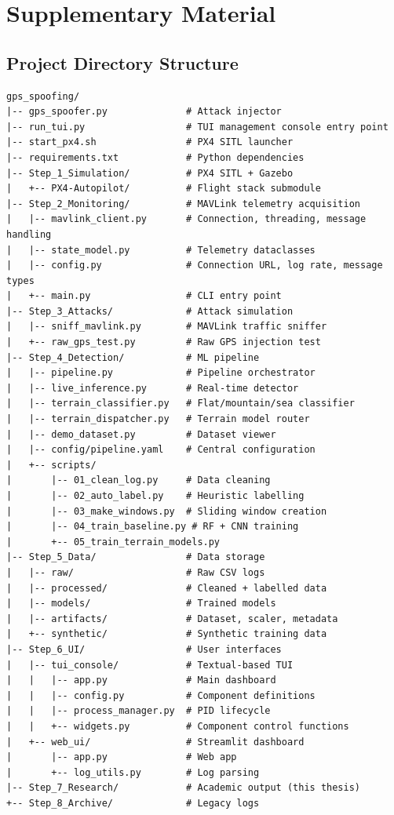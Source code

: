 \chapter{Supplementary Material}

\section{Project Directory Structure}

\begin{verbatim}
gps_spoofing/
|-- gps_spoofer.py              # Attack injector
|-- run_tui.py                  # TUI management console entry point
|-- start_px4.sh                # PX4 SITL launcher
|-- requirements.txt            # Python dependencies
|-- Step_1_Simulation/          # PX4 SITL + Gazebo
|   +-- PX4-Autopilot/          # Flight stack submodule
|-- Step_2_Monitoring/          # MAVLink telemetry acquisition
|   |-- mavlink_client.py       # Connection, threading, message handling
|   |-- state_model.py          # Telemetry dataclasses
|   |-- config.py               # Connection URL, log rate, message types
|   +-- main.py                 # CLI entry point
|-- Step_3_Attacks/             # Attack simulation
|   |-- sniff_mavlink.py        # MAVLink traffic sniffer
|   +-- raw_gps_test.py         # Raw GPS injection test
|-- Step_4_Detection/           # ML pipeline
|   |-- pipeline.py             # Pipeline orchestrator
|   |-- live_inference.py       # Real-time detector
|   |-- terrain_classifier.py   # Flat/mountain/sea classifier
|   |-- terrain_dispatcher.py   # Terrain model router
|   |-- demo_dataset.py         # Dataset viewer
|   |-- config/pipeline.yaml    # Central configuration
|   +-- scripts/
|       |-- 01_clean_log.py     # Data cleaning
|       |-- 02_auto_label.py    # Heuristic labelling
|       |-- 03_make_windows.py  # Sliding window creation
|       |-- 04_train_baseline.py # RF + CNN training
|       +-- 05_train_terrain_models.py
|-- Step_5_Data/                # Data storage
|   |-- raw/                    # Raw CSV logs
|   |-- processed/              # Cleaned + labelled data
|   |-- models/                 # Trained models
|   |-- artifacts/              # Dataset, scaler, metadata
|   +-- synthetic/              # Synthetic training data
|-- Step_6_UI/                  # User interfaces
|   |-- tui_console/            # Textual-based TUI
|   |   |-- app.py              # Main dashboard
|   |   |-- config.py           # Component definitions
|   |   |-- process_manager.py  # PID lifecycle
|   |   +-- widgets.py          # Component control functions
|   +-- web_ui/                 # Streamlit dashboard
|       |-- app.py              # Web app
|       +-- log_utils.py        # Log parsing
|-- Step_7_Research/            # Academic output (this thesis)
+-- Step_8_Archive/             # Legacy logs
\end{verbatim}

